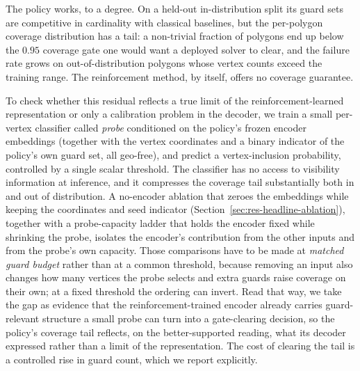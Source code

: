 \documentclass[11pt]{article}
\begin{document}
The policy works, to a degree. On a held-out in-distribution split its guard sets are competitive in cardinality with classical baselines, but the per-polygon coverage distribution has a tail: a non-trivial fraction of polygons end up below the $0.95$ coverage gate one would want a deployed solver to clear, and the failure rate grows on out-of-distribution polygons whose vertex counts exceed the training range. The reinforcement method, by itself, offers no coverage guarantee.

To check whether this residual reflects a true limit of the reinforcement-learned representation or only a calibration problem in the decoder, we train a small per-vertex classifier called \emph{probe} conditioned on the policy's frozen encoder embeddings (together with the vertex coordinates and a binary indicator of the policy's own guard set, all geo-free), and predict a vertex-inclusion probability, controlled by a single scalar threshold. The classifier has no access to visibility information at inference, and it compresses the coverage tail substantially both in and out of distribution. A no-encoder ablation that zeroes the embeddings while keeping the coordinates and seed indicator (Section~\ref{sec:res-headline-ablation}), together with a probe-capacity ladder that holds the encoder fixed while shrinking the probe, isolates the encoder's contribution from the other inputs and from the probe's own capacity. Those comparisons have to be made at \emph{matched guard budget} rather than at a common threshold, because removing an input also changes how many vertices the probe selects and extra guards raise coverage on their own; at a fixed threshold the ordering can invert. Read that way, we take the gap as evidence that the reinforcement-trained encoder already carries guard-relevant structure a small probe can turn into a gate-clearing decision, so the policy's coverage tail reflects, on the better-supported reading, what its decoder expressed rather than a limit of the representation. The cost of clearing the tail is a controlled rise in guard count, which we report explicitly.
\end{document}
